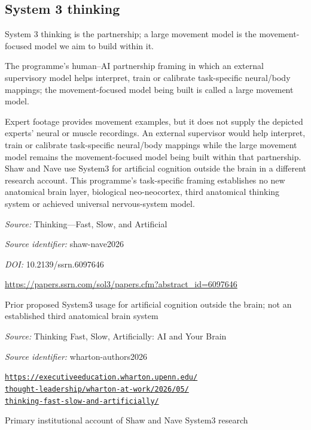 \begin{samepage}
\subsection*{System 3 thinking}
\noindent System 3 thinking is the partnership; a large movement model is the movement-focused model we aim to build within it.\par
\end{samepage}
\noindent The programme’s human–AI partnership framing in which an external supervisory model helps interpret, train or calibrate task-specific neural/body mappings; the movement-focused model being built is called a large movement model.\par
\noindent Expert footage provides movement examples, but it does not supply the depicted experts’ neural or muscle recordings. An external supervisor would help interpret, train or calibrate task-specific neural/body mappings while the large movement model remains the movement-focused model being built within that partnership. Shaw and Nave use System3 for artificial cognition outside the brain in a different research account. This programme’s task-specific framing establishes no new anatomical brain layer, biological neo-neocortex, third anatomical thinking system or achieved universal nervous-system model.\par



\noindent\textit{Source:} Thinking—Fast, Slow, and Artificial\par
\noindent\textit{Source identifier:} shaw-nave2026\par
\noindent\textit{DOI:} 10.2139/ssrn.6097646\par
\noindent\url{https://papers.ssrn.com/sol3/papers.cfm?abstract_id=6097646}\par
\noindent Prior proposed System3 usage for artificial cognition outside the brain; not an established third anatomical brain system\par
\noindent\textit{Source:} Thinking Fast, Slow, Artificially: AI and Your Brain\par
\noindent\textit{Source identifier:} wharton-authors2026\par
\noindent\href{https://executiveeducation.wharton.upenn.edu/thought-leadership/wharton-at-work/2026/05/thinking-fast-slow-and-artificially/}{\nolinkurl{https://executiveeducation.wharton.upenn.edu/}}\\
\href{https://executiveeducation.wharton.upenn.edu/thought-leadership/wharton-at-work/2026/05/thinking-fast-slow-and-artificially/}{\nolinkurl{thought-leadership/wharton-at-work/2026/05/}}\\
\href{https://executiveeducation.wharton.upenn.edu/thought-leadership/wharton-at-work/2026/05/thinking-fast-slow-and-artificially/}{\nolinkurl{thinking-fast-slow-and-artificially/}}\par
\noindent Primary institutional account of Shaw and Nave System3 research\par


